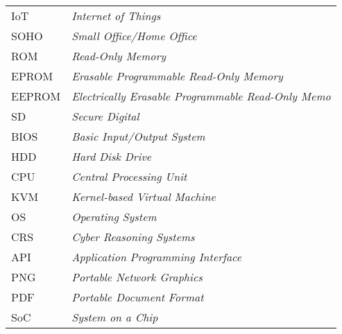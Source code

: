 \begin{longtable}{ll}
  IoT & \textit{Internet of Things} \\
  SOHO & \textit{Small Office/Home Office} \\
  ROM & \textit{Read-Only Memory} \\
  EPROM & \textit{Erasable Programmable Read-Only Memory} \\
  EEPROM & \textit{Electrically Erasable Programmable Read-Only Memo} \\
  SD & \textit{Secure Digital} \\
  BIOS & \textit{Basic Input/Output System} \\
  HDD & \textit{Hard Disk Drive} \\
  CPU & \textit{Central Processing Unit} \\
  KVM & \textit{Kernel-based Virtual Machine} \\
  OS & \textit{Operating System} \\
  CRS & \textit{Cyber Reasoning Systems} \\
  API & \textit{Application Programming Interface} \\
  PNG & \textit{Portable Network Graphics} \\
  PDF & \textit{Portable Document Format} \\
  SoC & \textit{System on a Chip} \\
\end{longtable}

